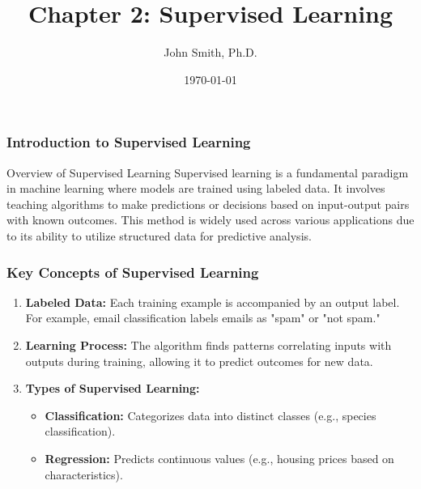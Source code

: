 \documentclass[aspectratio=169]{beamer}
\title[Supervised Learning]{Chapter 2: Supervised Learning}
\author[J. Smith]{John Smith, Ph.D.}
\institute[University Name]{
  Department of Computer Science\\
  University Name\\
  \vspace{0.3cm}
  Email: email@university.edu\\
  Website: www.university.edu
}
\date{\today}
\begin{document}
\frame{\titlepage}

\begin{frame}[fragile]
    \frametitle{Introduction to Supervised Learning}
    \begin{block}{Overview of Supervised Learning}
        Supervised learning is a fundamental paradigm in machine learning where models are trained using labeled data. It involves teaching algorithms to make predictions or decisions based on input-output pairs with known outcomes. This method is widely used across various applications due to its ability to utilize structured data for predictive analysis.
    \end{block}
\end{frame}

\begin{frame}[fragile]
    \frametitle{Key Concepts of Supervised Learning}
    \begin{enumerate}
        \item \textbf{Labeled Data:} Each training example is accompanied by an output label. For example, email classification labels emails as "spam" or "not spam."
        
        \item \textbf{Learning Process:} The algorithm finds patterns correlating inputs with outputs during training, allowing it to predict outcomes for new data.
        
        \item \textbf{Types of Supervised Learning:}
        \begin{itemize}
            \item \textbf{Classification:} Categorizes data into distinct classes (e.g., species classification).
            \item \textbf{Regression:} Predicts continuous values (e.g., housing prices based on characteristics).
        \end{itemize}
    \end{enumerate}
\end{frame}
\end{document}
